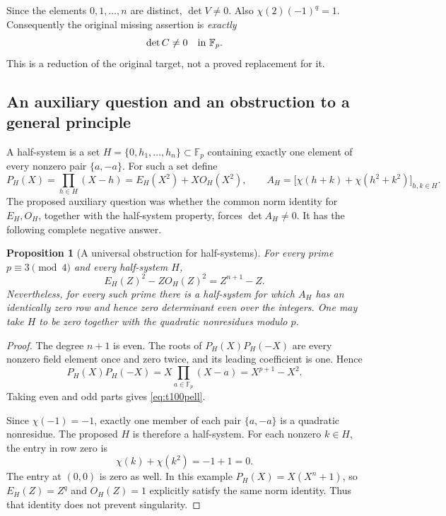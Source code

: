 \documentclass[11pt,a4paper]{article}
\newtheorem{proposition}[theorem]{Proposition}
\theoremstyle{definition}
\theoremstyle{remark}
\begin{document}
Since the elements $0,1,\ldots,n$ are distinct, $\det V\ne0$.
Also $\chi(2)(-1)^q=1$. Consequently the original missing assertion is
\emph{exactly}
\[
                         \det C\ne0\quad\hbox{in }\mathbb F_p.
\]
This is a reduction of the original target, not a proved replacement
for it.

\subsection{An auxiliary question and an obstruction to a general principle}

A half-system is a set $H=\{0,h_1,\ldots,h_n\}\subset\mathbb F_p$
containing exactly one element of every nonzero pair $\{a,-a\}$.
For such a set define
\[
 P_H(X)=\prod_{h\in H}(X-h)=E_H(X^2)+XO_H(X^2),
 \qquad
 A_H=\bigl[\chi(h+k)+\chi(h^2+k^2)\bigr]_{h,k\in H}.
\]
The proposed auxiliary question was whether the common norm identity
for $E_H,O_H$, together with the half-system property, forces
$\det A_H\ne0$. It has the following complete negative answer.

\begin{proposition}[A universal obstruction for half-systems]
For every prime $p\equiv3\pmod4$ and every half-system $H$,
\begin{equation}\label{eq:t100pell}
 E_H(Z)^2-ZO_H(Z)^2=Z^{n+1}-Z.
\end{equation}
Nevertheless, for every such prime there is a half-system for which
$A_H$ has an identically zero row and hence zero determinant even over
the integers. One may take $H$ to be zero together with the quadratic
nonresidues modulo $p$.
\end{proposition}

\begin{proof}
The degree $n+1$ is even. The roots of $P_H(X)P_H(-X)$ are every
nonzero field element once and zero twice, and its leading coefficient
is one. Hence
\[
 P_H(X)P_H(-X)=X\prod_{a\in\mathbb F_p}(X-a)
             =X^{p+1}-X^2.
\]
Taking even and odd parts gives \eqref{eq:t100pell}.

Since $\chi(-1)=-1$, exactly one member of each pair $\{a,-a\}$ is
a quadratic nonresidue. The proposed $H$ is therefore a half-system.
For each nonzero $k\in H$, the entry in row zero is
\[
                     \chi(k)+\chi(k^2)=-1+1=0.
\]
The entry at $(0,0)$ is zero as well. In this example
$P_H(X)=X(X^n+1)$, so $E_H(Z)=Z^q$ and $O_H(Z)=1$ explicitly satisfy
the same norm identity. Thus that identity does not prevent singularity.
\end{proof}
\end{document}
